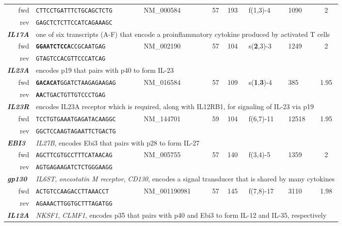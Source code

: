 \documentclass[12pt,a4paper]{scrreprt} %
\begin{document}
\begin{table}[htbp]
{\begin{tabular}{rllclllc}
\ fwd & \texttt{CTTCCTGATTTCTGCAGCTCTG} & NM\_000584 & 57 & 193 & f(1,3)-4 & 1090 & 2 \\ 
\ rev & \texttt{GAGCTCTCTTCCATCAGAAAGC} &  &  &  &  &  &  \\ 
\hline \multicolumn{1}{l}{\textit{\textbf{IL17A}}} & \multicolumn{7}{l}{one of six transcripts (A-F) that encode a proinflammatory cytokine produced by activated T cells} \\ 
\ fwd & \texttt{\textbf{GGAATCTCCA}CCGCAATGAG} & NM\_002190 & 57 & 104 & s(\textbf{2},3)-3 & 1249 & 2 \\ 
\ rev & \texttt{GTAGTCCACGTTCCCATCAG} &  &  &  &  &  &  \\ 
\hline \multicolumn{1}{l}{\textit{\textbf{IL23A}}} & \multicolumn{7}{l}{encodes p19    that pairs with p40 to form IL-23} \\ 
\ fwd & \texttt{\textbf{GACACAT}GGATCTAAGAGAAGAG} & NM\_016584 & 57 & 109  & s(\textbf{1},\textbf{3})-4 & 385 & 1.95 \\ 
\ rev & \texttt{\textbf{AA}CTGACTGTTGTCCCTGAG} &  &  &  &  &  &  \\ 
\hline \multicolumn{1}{l}{\textit{\textbf{IL23R}}} & \multicolumn{7}{l}{encodes IL23A receptor which is required, along with IL12RB1, for signaling of IL-23 via p19} \\ 
\ fwd & \texttt{TCCTGTGAAATGAGATACAAGGC} & NM\_144701 & 59 & 104 & f(6,7)-11 & 12518 & 1.95 \\ 
\ rev & \texttt{GGCTCCAAGTAGAATTCTGACTG} &  &  &  &  &  &  \\ 
\hline \multicolumn{1}{l}{\textit{\textbf{EBI3}}} & \multicolumn{7}{l}{\textit{IL27B}, encodes Ebi3 that pairs with p28 to form IL-27} \\ 
\ fwd & \texttt{AGCTTCGTGCCTTTCATAACAG} & NM\_005755 & 57 & 140 & f(3,4)-5 & 1359 & 2 \\ 
\ rev & \texttt{AGTGAGAAGATCTCTGGGAAGG} &  &  &  &  &  &  \\ 
\hline \multicolumn{1}{l}{\textit{\textbf{gp130}}} & \multicolumn{7}{l}{\textit{IL6ST}, \textit{oncostatin M receptor}, \textit{CD130}, encodes a signal transducer that is shared by many cytokines} \\ 
\ fwd & \texttt{ACTGTCCAAGACCTTAAACCT} & NM\_001190981 & 57 & 145 & f(7,8)-17 & 3110 & 1.98 \\ 
\ rev & \texttt{AGAAACTTGGTGCTTTAGATGG} &  &  &  &  &  &  \\ 
\hline \multicolumn{1}{l}{\textit{\textbf{IL12A}}} & \multicolumn{7}{l}{\textit{NKSF1}, \textit{CLMF1}, encodes p35 that pairs with p40 and Ebi3 to form IL-12 and IL-35, respectively} \\ 

\end{tabular}}
\end{table}
\end{document}
